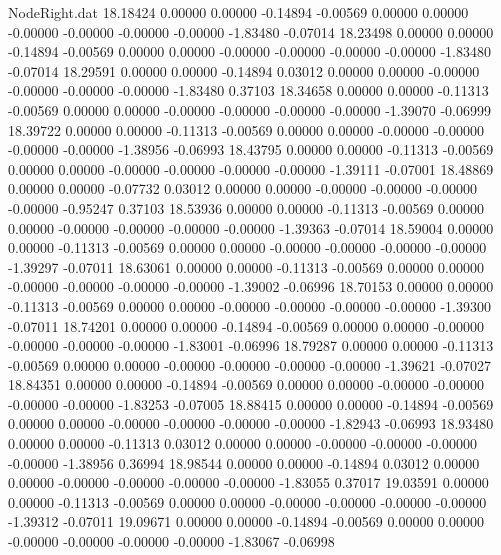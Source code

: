 \begin{filecontents}{NodeRight.dat}
  18.18424    0.00000    0.00000    -0.14894   -0.00569    0.00000    0.00000   -0.00000   -0.00000   -0.00000   -0.00000   -1.83480   -0.07014
  18.23498    0.00000    0.00000    -0.14894   -0.00569    0.00000    0.00000   -0.00000   -0.00000   -0.00000   -0.00000   -1.83480   -0.07014
  18.29591    0.00000    0.00000    -0.14894    0.03012    0.00000    0.00000   -0.00000   -0.00000   -0.00000   -0.00000   -1.83480    0.37103
  18.34658    0.00000    0.00000    -0.11313   -0.00569    0.00000    0.00000   -0.00000   -0.00000   -0.00000   -0.00000   -1.39070   -0.06999
  18.39722    0.00000    0.00000    -0.11313   -0.00569    0.00000    0.00000   -0.00000   -0.00000   -0.00000   -0.00000   -1.38956   -0.06993
  18.43795    0.00000    0.00000    -0.11313   -0.00569    0.00000    0.00000   -0.00000   -0.00000   -0.00000   -0.00000   -1.39111   -0.07001
  18.48869    0.00000    0.00000    -0.07732    0.03012    0.00000    0.00000   -0.00000   -0.00000   -0.00000   -0.00000   -0.95247    0.37103
  18.53936    0.00000    0.00000    -0.11313   -0.00569    0.00000    0.00000   -0.00000   -0.00000   -0.00000   -0.00000   -1.39363   -0.07014
  18.59004    0.00000    0.00000    -0.11313   -0.00569    0.00000    0.00000   -0.00000   -0.00000   -0.00000   -0.00000   -1.39297   -0.07011
  18.63061    0.00000    0.00000    -0.11313   -0.00569    0.00000    0.00000   -0.00000   -0.00000   -0.00000   -0.00000   -1.39002   -0.06996
  18.70153    0.00000    0.00000    -0.11313   -0.00569    0.00000    0.00000   -0.00000   -0.00000   -0.00000   -0.00000   -1.39300   -0.07011
  18.74201    0.00000    0.00000    -0.14894   -0.00569    0.00000    0.00000   -0.00000   -0.00000   -0.00000   -0.00000   -1.83001   -0.06996
  18.79287    0.00000    0.00000    -0.11313   -0.00569    0.00000    0.00000   -0.00000   -0.00000   -0.00000   -0.00000   -1.39621   -0.07027
  18.84351    0.00000    0.00000    -0.14894   -0.00569    0.00000    0.00000   -0.00000   -0.00000   -0.00000   -0.00000   -1.83253   -0.07005
  18.88415    0.00000    0.00000    -0.14894   -0.00569    0.00000    0.00000   -0.00000   -0.00000   -0.00000   -0.00000   -1.82943   -0.06993
  18.93480    0.00000    0.00000    -0.11313    0.03012    0.00000    0.00000   -0.00000   -0.00000   -0.00000   -0.00000   -1.38956    0.36994
  18.98544    0.00000    0.00000    -0.14894    0.03012    0.00000    0.00000   -0.00000   -0.00000   -0.00000   -0.00000   -1.83055    0.37017
  19.03591    0.00000    0.00000    -0.11313   -0.00569    0.00000    0.00000   -0.00000   -0.00000   -0.00000   -0.00000   -1.39312   -0.07011
  19.09671    0.00000    0.00000    -0.14894   -0.00569    0.00000    0.00000   -0.00000   -0.00000   -0.00000   -0.00000   -1.83067   -0.06998

\end{filecontents}
